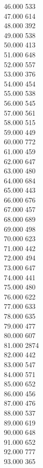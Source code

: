 { 46.000	533 \\
 47.000	614 \\
 48.000	392 \\
 49.000	538 \\
 50.000	413 \\
 51.000	648 \\
 52.000	557 \\
 53.000	376 \\
 54.000	454 \\
 55.000	538 \\
 56.000	545 \\
 57.000	561 \\
 58.000	515 \\
 59.000	449 \\
 60.000	772 \\
 61.000	459 \\
 62.000	647 \\
 63.000	480 \\
 64.000	684 \\
 65.000	443 \\
 66.000	676 \\
 67.000	457 \\
 68.000	689 \\
 69.000	498 \\
 70.000	623 \\
 71.000	442 \\
 72.000	494 \\
 73.000	647 \\
 74.000	441 \\
 75.000	480 \\
 76.000	622 \\
 77.000	633 \\
 78.000	635 \\
 79.000	477 \\
 80.000	607 \\
 81.000	2874 \\
 82.000	442 \\
 83.000	547 \\
 84.000	571 \\
 85.000	652 \\
 86.000	456 \\
 87.000	476 \\
 88.000	537 \\
 89.000	619 \\
 90.000	648 \\
 91.000	652 \\
 92.000	777 \\
 93.000	365 \\
}
